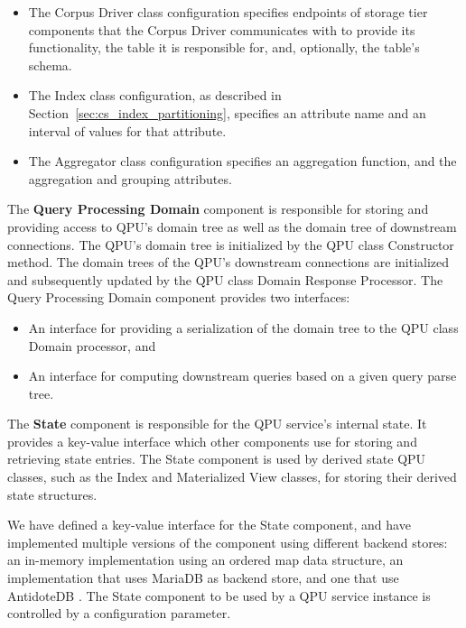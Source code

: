 \begin{itemize}
  \item The Corpus Driver class configuration specifies endpoints of storage tier components that the Corpus Driver communicates with to provide its functionality,
  the table it is responsible for, and, optionally, the table's schema.

  \item The Index class configuration, as described in Section~\ref{sec:cs_index_partitioning},
  specifies an attribute name and an interval of values for that attribute.

  \item The Aggregator class configuration specifies an aggregation function, and the aggregation and grouping attributes.
\end{itemize}

\medskip
\noindent
The \textbf{Query Processing Domain} component is responsible for storing and providing access to QPU's domain tree as well
as the domain tree of downstream connections.
The QPU's domain tree is initialized by the QPU class Constructor method.
The domain trees of the QPU's downstream connections are initialized and subsequently updated by the QPU class Domain Response Processor.
The Query Processing Domain component provides two interfaces:
\begin{itemize}
  \item An interface for providing a serialization of the domain tree to the QPU class Domain processor, and
  \item An interface for computing downstream queries based on a given query parse tree.
\end{itemize}

\bigskip
\noindent
The \textbf{State} component is responsible for the QPU service's internal state.
It provides a key-value interface which other components use for storing and retrieving state entries.
The State component is used by derived state QPU classes, such as the Index and Materialized View classes,
for storing their derived state structures.

We have defined a key-value interface for the State component,
and have implemented multiple versions of the component using different backend stores:
an in-memory implementation using an ordered map data structure,
an implementation that uses MariaDB \cite{mariadb:docs} as backend store,
and one that use AntidoteDB \cite{antidotedb:docs}.
The State component to be used by a QPU service instance is controlled by a configuration parameter.

